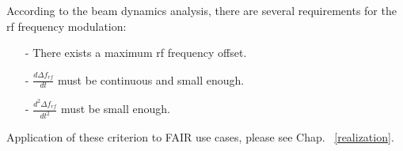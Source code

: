 According to the beam dynamics analysis, there are several requirements for the rf frequency modulation: 
\begin{itemize}
\item[-]
There exists a maximum rf frequency offset. 
\item[-]
$\frac{d\Delta f_{\mathit{rf}}}{dt}$ must be continuous and small enough. 
\item[-]
$\frac{d^2\Delta f_{\mathit{rf}}}{dt^2}$ must be small enough. 
\end{itemize}
Application of these criterion to FAIR use cases, please see Chap. ~\ref{realization}.
%
%
%
%
%
%
%
%

